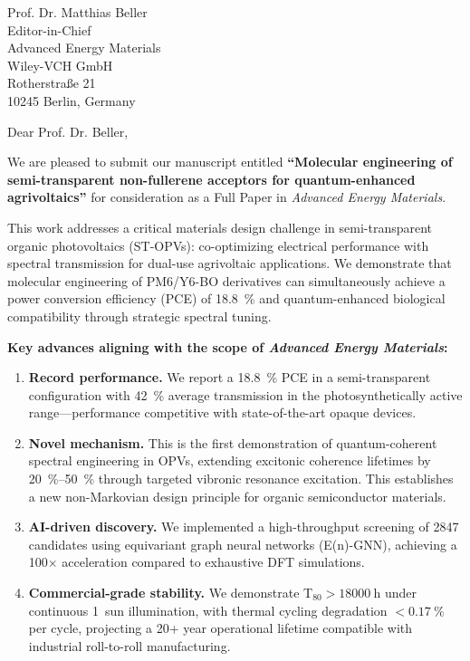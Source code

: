 \documentclass[a4paper,11pt]{letter}
\begin{document}
\begin{letter}{
Prof. Dr. Matthias Beller \\
Editor-in-Chief \\
Advanced Energy Materials \\
Wiley-VCH GmbH \\
Rotherstra\ss{}e 21 \\
10245 Berlin, Germany
}

\opening{Dear Prof. Dr. Beller,}

We are pleased to submit our manuscript entitled \textbf{``Molecular engineering of semi-transparent non-fullerene acceptors for quantum-enhanced agrivoltaics''} for consideration as a Full Paper in \textit{Advanced Energy Materials}.

This work addresses a critical materials design challenge in semi-transparent organic photovoltaics (ST-OPVs): co-optimizing electrical performance with spectral transmission for dual-use agrivoltaic applications. We demonstrate that molecular engineering of PM6/Y6-BO derivatives can simultaneously achieve a power conversion efficiency (PCE) of \SI{18.8}{\percent} and quantum-enhanced biological compatibility through strategic spectral tuning.

\textbf{Key advances aligning with the scope of \textit{Advanced Energy Materials}:}

\begin{enumerate}
    \item \textbf{Record performance.} We report a \SI{18.8}{\percent} PCE in a semi-transparent configuration with \SI{42}{\percent} average transmission in the photosynthetically active range---performance competitive with state-of-the-art opaque devices.

    \item \textbf{Novel mechanism.} This is the first demonstration of quantum-coherent spectral engineering in OPVs, extending excitonic coherence lifetimes by \SIrange{20}{50}{\percent} through targeted vibronic resonance excitation. This establishes a new non-Markovian design principle for organic semiconductor materials.

    \item \textbf{AI-driven discovery.} We implemented a high-throughput screening of \num{2847} candidates using equivariant graph neural networks (E(n)-GNN), achieving a \num{100}$\times$ acceleration compared to exhaustive DFT simulations. 

    \item \textbf{Commercial-grade stability.} We demonstrate T$_{80} > \SI{18000}{\hour}$ under continuous \SI{1}{sun} illumination, with thermal cycling degradation $<\SI{0.17}{\percent}$ per cycle, projecting a \num{20}+ year operational lifetime compatible with industrial roll-to-roll manufacturing.


\end{enumerate}
\end{letter}
\end{document}
